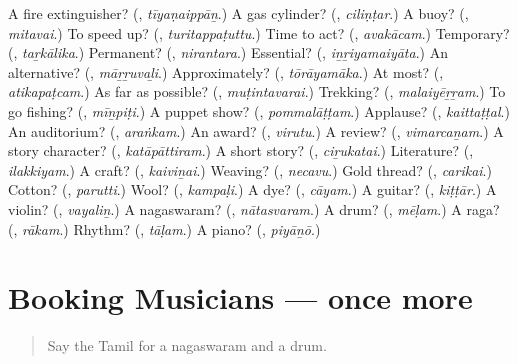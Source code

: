 \begin{tcolorbox}[breakable,colback=teal!4,colframe=teal!35!black,title={Before you move on}]
A fire extinguisher? (\textbf{}, \emph{tīyaṇaippāṉ}.) A gas cylinder? (\textbf{}, \emph{ciliṇṭar}.) A buoy? (\textbf{}, \emph{mitavai}.) To speed up? (\textbf{}, \emph{turitappaṭuttu}.) Time to act? (\textbf{}, \emph{avakācam}.) Temporary? (\textbf{}, \emph{taṟkālika}.) Permanent? (\textbf{}, \emph{nirantara}.) Essential? (\textbf{}, \emph{iṉṟiyamaiyāta}.) An alternative? (\textbf{}, \emph{māṟṟuvaḻi}.) Approximately? (\textbf{}, \emph{tōrāyamāka}.) At most? (\textbf{}, \emph{atikapaṭcam}.) As far as possible? (\textbf{}, \emph{muṭintavarai}.) Trekking? (\textbf{}, \emph{malaiyēṟṟam}.) To go fishing? (\textbf{}, \emph{mīṉpiṭi}.) A puppet show? (\textbf{}, \emph{pommalāṭṭam}.) Applause? (\textbf{}, \emph{kaittaṭṭal}.) An auditorium? (\textbf{}, \emph{araṅkam}.) An award? (\textbf{}, \emph{virutu}.) A review? (\textbf{}, \emph{vimarcaṉam}.) A story character? (\textbf{}, \emph{katāpāttiram}.) A short story? (\textbf{}, \emph{ciṟukatai}.) Literature? (\textbf{}, \emph{ilakkiyam}.) A craft? (\textbf{}, \emph{kaiviṉai}.) Weaving? (\textbf{}, \emph{necavu}.) Gold thread? (\textbf{}, \emph{carikai}.) Cotton? (\textbf{}, \emph{parutti}.) Wool? (\textbf{}, \emph{kampaḷi}.) A dye? (\textbf{}, \emph{cāyam}.) A guitar? (\textbf{}, \emph{kiṭṭār}.) A violin? (\textbf{}, \emph{vayaliṉ}.) A nagaswaram? (\textbf{}, \emph{nātasvaram}.) A drum? (\textbf{}, \emph{mēḷam}.) A raga? (\textbf{}, \emph{rākam}.) Rhythm? (\textbf{}, \emph{tāḷam}.) A piano? (\textbf{}, \emph{piyāṉō}.)
\end{tcolorbox}
\section[(dialogue)]{Booking Musicians — once more}

\label{lesson:TA-R558-review-final-558}



\begin{quote}
Say the Tamil for a nagaswaram and a drum.
\end{quote}

